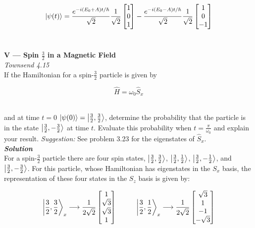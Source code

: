 \documentclass[9pt]{extarticle}
\newcommand{\bfit}[1]{\textbf{\textit{#1}}}
\begin{document}
\begin{multicols*}{2}
$$
\ket{\psi(t)} =  \frac{e^{-i(E_0 + A)t/\hbar}}{\sqrt 2} \frac{1}{\sqrt 2} 
\begin{bmatrix}
        1 \\ 0 \\ 1
\end{bmatrix} - 
\frac{e^{-i(E_0 -A)t/\hbar}}{\sqrt 2} \frac{1}{\sqrt 2} 
\begin{bmatrix}
        1 \\ 0 \\ -1
\end{bmatrix}
$$ \ 







\hrulefill 

\hfill 

{\bf \LARGE V --- Spin $\frac 32$ in a Magnetic Field} \\ 

{\it Townsend 4.15} \\  
If the Hamiltonian for a spin-$\frac 32$ particle is given by

$$\hat H = \omega_0 \hat S_x$$ \ 

and at time $t=0$ $\ket{\psi(0)} = \ket{\frac 32, \frac 32}$, determine the probability that the particle is in the state $\ket{\frac 32, -\frac 32}$ at time $t$. Evaluate this probability when $t = \frac{\pi}{\omega_0}$ and explain your result. {\it Suggestion:} See problem 3.23 for the eigenstates of $\hat S_x$. \\ 

{\bfit{Solution}} \\ 
For a spin-$\frac 32$ particle there are four spin states, $\ket{\frac 32, \frac 32}$, $\ket{\frac 32, \frac 12}$, $\ket{\frac 32, -\frac 12}$, and $\ket{\frac 32, -\frac 32}$. For this particle, whose Hamiltonian has eigenstates in the $S_x$ basis, the representation of these four states in the $S_z$ basis is given by:

$$
\ket{\frac 32 , \frac 32}_x \longrightarrow \frac{1}{2\sqrt 2}
\begin{bmatrix}
        1 \\
        \sqrt 3 \\
        \sqrt 3 \\
        1
\end{bmatrix}
\hspace{1cm}
\ket{\frac 32 , \frac 12}_x \longrightarrow \frac{1}{2\sqrt 2}
\begin{bmatrix}
        \sqrt 3 \\
        1 \\
        -1 \\
        -\sqrt 3
\end{bmatrix}
$$


\end{multicols*}
\end{document}
